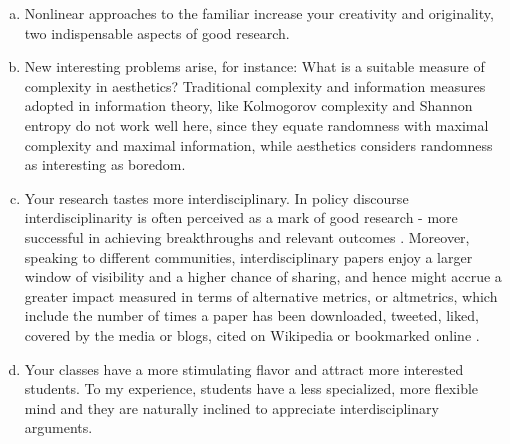 \documentclass{article}
\begin{document}
\begin{enumerate}[(a)]

\item Nonlinear approaches to the familiar increase your creativity and originality, two indispensable aspects of good research.   

\item New interesting problems arise, for instance: What is a suitable measure of complexity in aesthetics? Traditional complexity and information measures adopted in information theory, like Kolmogorov complexity and Shannon entropy do not work well here, since they equate randomness with maximal complexity and maximal information, while aesthetics considers randomness as interesting as boredom.

\item Your research tastes more interdisciplinary. In policy discourse interdisciplinarity is often perceived as a mark of good research - more successful in achieving breakthroughs and relevant outcomes \cite{RM10}. Moreover, speaking to different communities, interdisciplinary papers enjoy a larger window of visibility and a higher chance of sharing, and hence might accrue a greater impact measured in terms of alternative metrics, or altmetrics, which include the number of times a paper has been downloaded, tweeted, liked, covered by the media or blogs, cited on Wikipedia or bookmarked online \cite{K13}.

\item Your classes have a more stimulating flavor and attract more interested students. To my experience, students have a less specialized, more flexible mind and they are naturally inclined to appreciate interdisciplinary arguments. 
\end{enumerate}  
\end{document}
